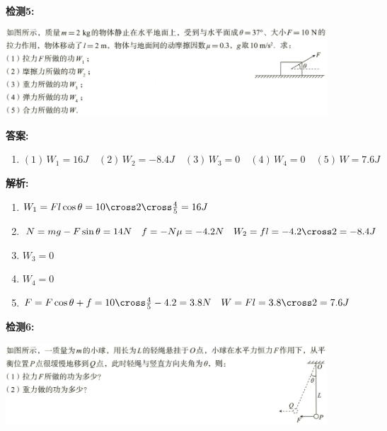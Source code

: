 \documentclass{article}
\begin{document}
\begin{itemize}
\begin{enumerate}
                  \vspace{1em}

                  \textbf{检测5:}

                  \includegraphics[width=0.9\textwidth]{pictures/1.png}

                  \vspace{1em}

                  \textbf{答案:}
                  \begin{enumerate}
                      \item[] $(1) \, W_{1} = 16 J \quad (2)\,W_{2} = -8.4J \quad (3)\,W_{3} = 0 \quad (4)\,W_{4} = 0 \quad (5)\,W = 7.6J$
                  \end{enumerate}

                  \textbf{解析:}
                  \begin{enumerate}[label=(\arabic*)]
                      \item $W_{1} = Fl\cos{\theta} = 10 \cross 2 \cross \frac{4}{5} = 16 J$
                      \item $N = mg - F\sin{\theta} = 14 N \quad f = - N \mu = -4.2N \quad W_{2} = fl = -4.2 \cross 2 = -8.4J$
                      \item $W_{3} = 0$
                      \item $W_{4} = 0$
                      \item $F = F\cos{\theta} + f = 10 \cross \frac{4}{5} - 4.2 = 3.8N \quad W = Fl = 3.8 \cross 2 = 7.6J$
                  \end{enumerate}

                  \vspace{2em}

                  \textbf{检测6:}

                  \includegraphics[width=0.9\textwidth]{pictures/2.png}


\end{enumerate}
\end{itemize}
\end{document}

